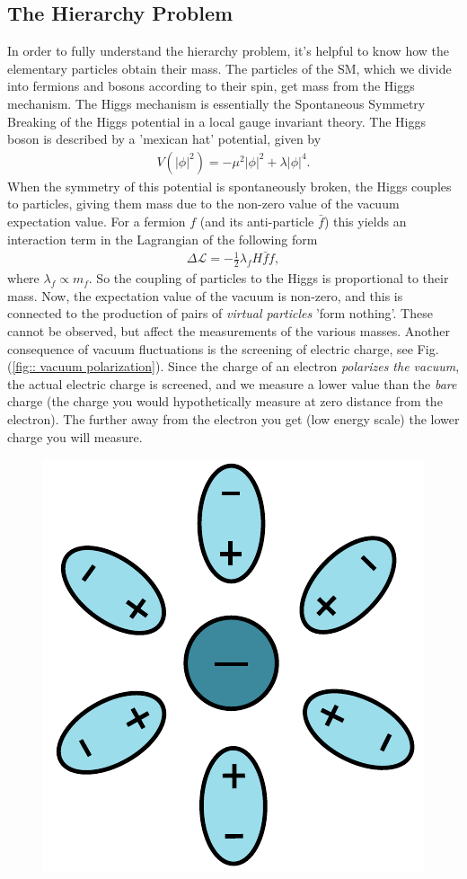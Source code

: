 \documentclass[11pt]{article}
\begin{document}
\subsection*{The Hierarchy Problem}
\begin{flushleft}
In order to fully understand the hierarchy problem, it's helpful to know how the elementary particles obtain their mass. The particles of the SM, which we divide into fermions and bosons according to their spin, get mass from the Higgs mechanism. The Higgs mechanism is essentially the Spontaneous Symmetry Breaking of the Higgs potential in a local gauge invariant theory. The Higgs boson is described by a 'mexican hat' potential, given by
\begin{align*}
V(|\phi|^2) = - \mu^2 |\phi|^2 + \lambda|\phi|^4.
\end{align*}
When the symmetry of this potential is spontaneously broken, the Higgs couples to particles, giving them mass due to the non-zero value of the vacuum expectation value. For a fermion $f$ (and its anti-particle $\bar{f}$) this yields an interaction term in the Lagrangian of the following form
\begin{align}
\Delta \mathcal{L} = - \frac{1}{2} \lambda_f H \bar{f}f,
\end{align}
where $\lambda_f \propto m_f$. So the coupling of particles to the Higgs is proportional to their mass. Now, the expectation value of the vacuum is non-zero, and this is connected to the production of pairs of \textit{virtual particles} 'form nothing'. These cannot be observed, but affect the measurements  of the various masses. Another consequence of vacuum fluctuations is the screening of electric charge, see Fig. (\ref{fig:: vacuum polarization}). Since the charge of an electron \textit{polarizes the vacuum}, the actual electric charge is screened, and we measure a lower value than the \textit{bare} charge (the charge you would hypothetically measure at zero distance from the electron). The further away from the electron you get (low energy scale) the lower charge you will measure.
\begin{figure}[H]
\centering
\includegraphics[scale=0.6]{vacuum_polarization.pdf}

\end{figure}
\end{flushleft}
\end{document}
